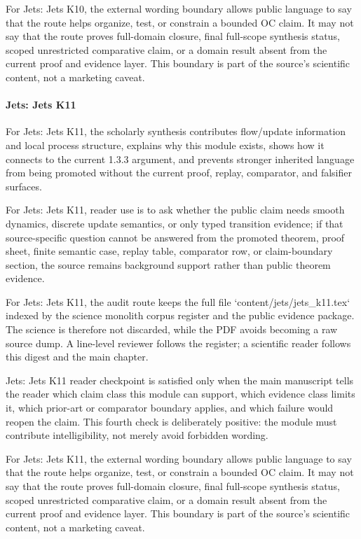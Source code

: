 For Jets: Jets K10, the external wording boundary allows public language to say that the route helps organize, test, or constrain a bounded OC claim. It may not say that the route proves full-domain closure, final full-scope synthesis status, scoped unrestricted comparative claim, or a domain result absent from the current proof and evidence layer. This boundary is part of the source's scientific content, not a marketing caveat.


\paragraph{Jets: Jets K11}

For Jets: Jets K11, the scholarly synthesis contributes flow/update information and local process structure, explains why this module exists, shows how it connects to the current 1.3.3 argument, and prevents stronger inherited language from being promoted without the current proof, replay, comparator, and falsifier surfaces.


For Jets: Jets K11, reader use is to ask whether the public claim needs smooth dynamics, discrete update semantics, or only typed transition evidence; if that source-specific question cannot be answered from the promoted theorem, proof sheet, finite semantic case, replay table, comparator row, or claim-boundary section, the source remains background support rather than public theorem evidence.


For Jets: Jets K11, the audit route keeps the full file `content/jets/jets\_k11.tex` indexed by the science monolith corpus register and the public evidence package. The science is therefore not discarded, while the PDF avoids becoming a raw source dump. A line-level reviewer follows the register; a scientific reader follows this digest and the main chapter.


Jets: Jets K11 reader checkpoint is satisfied only when the main manuscript tells the reader which claim class this module can support, which evidence class limits it, which prior-art or comparator boundary applies, and which failure would reopen the claim. This fourth check is deliberately positive: the module must contribute intelligibility, not merely avoid forbidden wording.


For Jets: Jets K11, the external wording boundary allows public language to say that the route helps organize, test, or constrain a bounded OC claim. It may not say that the route proves full-domain closure, final full-scope synthesis status, scoped unrestricted comparative claim, or a domain result absent from the current proof and evidence layer. This boundary is part of the source's scientific content, not a marketing caveat.


